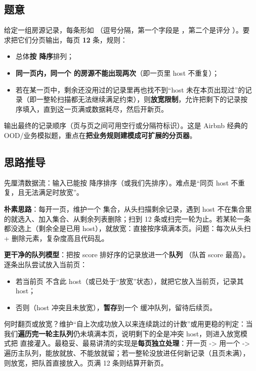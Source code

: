\subsection*{题意}
给定一组房源记录，每条形如 （逗号分隔，第一个字段是 ，第二个是评分 ）。要求把它们分页输出，每页 \textbf{12} 条，规则：
\begin{itemize}
  \item 总体\textbf{按  降序}排列；
  \item \textbf{同一页内，同一个  的房源不能出现两次}（即一页里 host 不重复）；
  \item 若在某一页中，剩余还没用过的记录里再也找不到“host 未在本页出现过”的记录（即一整轮扫描都无法继续满足约束），则\textbf{放宽限制}，允许把剩下的记录按序填入，直到这一页满或数据耗尽，然后开新页。
\end{itemize}
输出最终的记录顺序（页与页之间可用空行或分隔符标识）。这是 Airbnb 经典的 OOD/业务模拟题，重点在\textbf{把业务规则建模成可扩展的分页器}。

\subsection*{思路推导}
先厘清数据流：输入已能按  降序排序（或我们先排序）。难点是“同页 host 不重复，且无法满足时放宽”。

\textbf{朴素思路}：每开一页，维护一个  集合，从头扫描剩余记录，遇到 host 不在集合里的就选入、加入集合、从剩余列表删除；扫到 12 条或扫完一轮为止。若某轮一条都没选上（剩余全是已用 host），就放宽：直接按序填满本页。问题：每次从头扫 + 删除元素，复杂度高且代码乱。

\textbf{更干净的队列模型}：把按 score 排好序的记录放进一个\textbf{队列} （队首 score 最高）。逐条出队尝试放入当前页：
\begin{itemize}
  \item 若当前页  不含此 host（或已处于“放宽”状态），就把它放入当前页，记录其 host；
  \item 否则（host 冲突且未放宽），\textbf{暂存}到一个  缓冲队列，留待后续页。
\end{itemize}
何时翻页或放宽？维护“自上次成功放入以来连续跳过的计数”或用更稳的判定：当我们\textbf{遍历完一轮主队列}仍未填满本页，说明剩下的全是冲突 host，则进入放宽模式把  直接灌入。最稳妥、最易讲清的实现是\textbf{每页独立处理}：开一页 -> 用一个  -> 遍历主队列，能放就放、不能放就留；若一整轮没放进任何新记录（且页未满），则放宽，把队首直接放入。页满 12 条则结算开新页。

